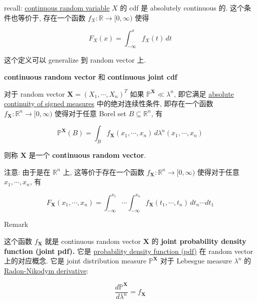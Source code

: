 \documentclass{qlnotes-export}
\begin{document}
recall: \href{https://qiulinfan.github.io/notes/math/probability/\#kn-continuous-random-variable}{continuous random variable} \(X\) 的 cdf 是 absolutely continuous 的. 这个条件也等价于, 存在一个函数 \(f_{X}:{\mathbb{R}}\rightarrow\lbrack 0,\infty)\) 使得

\[F_{X}(x) = \int_{- \infty}^{x}f_{X}(t)\, dt\]

这个定义可以 generalize 到 random vector 上.

\begin{definition}{\protect{}\label{kn-continuous-random-vector-continuous-joint-cdf}{\textbf{continuous
random vector}} 和
\protect{}\label{kn-continuous-joint-cdf}{\textbf{continuous
joint cdf}}}

对于 random vector \(\mathbf{X} = (X_{1},\cdots,X_{n})^{T}\) 如果 \({\mathbb{P}}^{\mathbf{X}} \ll \lambda^{n}\), 即它满足 \href{https://qiulinfan.github.io/notes/math/measure-theory/\#kn-absolute-continuity-of-signed-measures}{absolute continuity of signed measures} 中的绝对连续性条件, 即存在一个函数 \(f_{\mathbf{X}}:{\mathbb{R}}^{n}\rightarrow\lbrack 0,\infty)\) 使得对于任意 Borel set \(B \subseteq {\mathbb{R}}^{n}\), 有

\[{\mathbb{P}}^{\mathbf{X}}(B) = \int_{B}f_{\mathbf{X}}(x_{1},\cdots,x_{n})\, d\lambda^{n}(x_{1},\cdots,x_{n})\]

则称 \(\mathbf{X}\) 是一个 \textbf{continuous random vector}.

注意: 由于是在 \({\mathbb{R}}^{n}\) 上, 这等价于存在一个函数 \(f_{\mathbf{X}}:{\mathbb{R}}^{n}\rightarrow\lbrack 0,\infty)\) 使得对于任意 \(x_{1},\cdots,x_{n}\), 有

\[F_{\mathbf{X}}(x_{1},\cdots,x_{n}) = \int_{- \infty}^{x_{1}}\cdots\int_{- \infty}^{x_{n}}f_{\mathbf{X}}(t_{1},\cdots,t_{n})\, dt_{n}\cdots dt_{1}\]

\end{definition}

\begin{qlremark}{Remark}

这个函数 \(f_{\mathbf{X}}\) 就是 continuous random vector \(\mathbf{X}\) 的 \textbf{joint probability density function (joint pdf).} 它是 \href{https://qiulinfan.github.io/notes/math/probability/\#kn-probability-density-function-pdf}{probability density function (pdf)} 在 random vector 上的对应概念. 它是 joint distribution measure \({\mathbb{P}}^{\mathbf{X}}\) 对于 Lebesgue measure \(\lambda^{n}\) 的 \href{https://qiulinfan.github.io/notes/math/measure-theory/\#kn-radon-nikodym-derivative}{Radon-Nikodym derivative}:

\[\frac{d{\mathbb{P}}^{\mathbf{X}}}{d\lambda^{n}} = f_{\mathbf{X}}\]

\end{qlremark}
\end{document}
